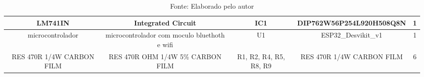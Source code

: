 \documentclass[../delivery_hospital_report.tex]{subfiles}
\begin{document}
\begin{table}[!h]
\begin{adjustbox}{width=\columnwidth,center}
\begin{tabular}{|c|c|c|c|c|}
LM741IN                   & Integrated Circuit                           & IC1                    & DIP762W56P254L920H508Q8N  & 1        \\ \hline
microcontrolador          & microcontrolador com moculo bluethoth e wifi & U1                     & ESP32\_Desvikit\_v1       & 1        \\ \hline
RES 470R 1/4W CARBON FILM & RES 470R OHM 1/4W 5\% CARBON FILM            & R1, R2, R4, R5, R8, R9 & RES 470R 1/4W CARBON FILM & 6        \\ \hline
\end{tabular}
\end{adjustbox}
\centering
\caption*{Fonte: Elaborado pelo autor}
\label{table:Componentes placa de Controle - Protótipo}
\end{table}
\end{document}

